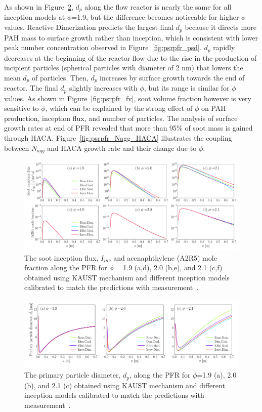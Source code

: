 As shown in Figure~\ref{fig:psrpfr_dp}, $d_p$ along the flow reactor is nearly the same for all inception models at $\phi$=1.9, but the difference becomes noticeable for higher $\phi$ values. Reactive Dimerization predicts the largest final $d_p$ because it directs more PAH mass to surface growth rather than inception, which is consistent with lower peak number concentration observed in Figure~\ref{fig:psrpfr_psd}. $d_p$ rapidly decreases at the beginning of the reactor flow due to the rise in the production of incipient particles (spherical particles with diameter of 2 nm) that lowers the mean $d_p$ of particles. Then, $d_p$ increases by surface growth towards the end of reactor. The final $d_p$ slightly increases with $\phi$, but its range is similar for $\phi$ values. As shown in Figure~\ref{fig:psrpfr_fv}, soot volume fraction however is very sensitive to $\phi$, which can be explained by the strong effect of $\phi$ on PAH production, inception flux, and number of particles. The analysis of surface growth rates at end of PFR revealed that more than 95\% of soot mass is gained through HACA. Figure~\ref{fig:psrpfr_Nagg_HACA} illustrates the coupling between $N_{agg}$ and HACA growth rate and their change due to $\phi$.  


\begin{figure}[H]
	\centering
	\includegraphics[width=1\textwidth]{Figures/Results/PSR/I_inc_PAH_eq_ratio_all_single_mech.pdf}
	\caption{The soot inception flux, $I_{inc}$ and acenaphthylene (A2R5) mole fraction along the PFR for $\phi=$1.9 (a,d), 2.0 (b,e), and 2.1 (c,f) obtained using KAUST mechanism and different inception models calibrated to match the predictions with measurement~\citep{manzello2007soot}.}
	\label{fig:psrpfr_Iinc_PAH} 
\end{figure}

\begin{figure}[H]
	\centering
	\includegraphics[width=1\textwidth]{Figures/Results/PSR/d_p_eq_ratio_all_single_mech.pdf}
	\caption{The primary particle diameter, $d_p$, along the PFR for $\phi$=1.9 (a), 2.0 (b), and 2.1 (c) obtained using KAUST mechanism and different inception models calibrated to match the predictions with measurement~\citep{manzello2007soot}.}
	\label{fig:psrpfr_dp} 
\end{figure}

